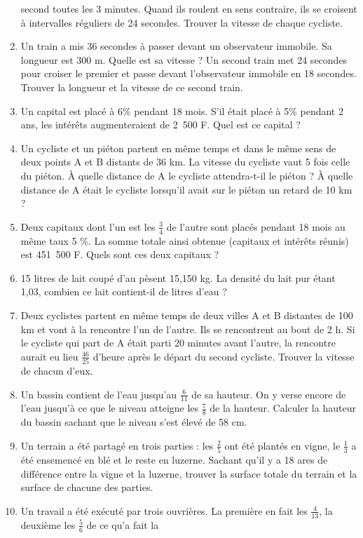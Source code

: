 \begin{enumerate}
 second toutes les 3 minutes. Quand ils roulent en sens contraire, ils se croisent à intervalles réguliers de 24 secondes. Trouver la 
 vitesse de chaque cycliste. 
 \item Un train a mis 36 secondes à passer devant un observateur immobile. Sa longueur est 300 m. Quelle est sa vitesse ? Un second 
 train met 24 secondes pour croiser le premier et passe devant l'observateur immobile en 18 secondes. Trouver la longueur et la 
 vitesse de ce second train. 
 \item Un capital est placé à 6\% pendant 18 mois. S'il était placé à 5\% pendant 2 ans, les intérêts augmenteraient de 2~500 F. Quel 
 est ce capital ?
 \item Un cycliste et un piéton partent en même temps et dans le même sens de deux points A et B distants de 36 km. La vitesse du cycliste vaut 5 fois celle du piéton. À quelle distance de A le cycliste attendra-t-il le piéton ? À quelle distance de A était le cycliste lorsqu'il avait sur le piéton un retard de 10 km ?  
 \item Deux capitaux dont l'un est les $\frac34$ de l'autre sont placés pendant 18 mois au même taux 5 \%. La somme totale ainsi obtenue (capitaux et intérêts réunis) est 451~500 F. Quels sont ces deux capitaux ? 
 \item 15 litres de lait coupé d'au pèsent 15,150 kg. La densité du lait pur étant 1,03, combien ce lait contient-il de litres d'eau ? 
 \item Deux cyclistes partent en même temps de deux villes A et B distantes de 100 km et vont à la rencontre l'un de l'autre. Ils 
 se rencontrent au bout de 2 h. Si le cycliste qui part de A était parti 20 minutes avant l'autre, la rencontre aurait eu lieu
 $\frac{46}{25}$ d'heure après le départ du second cycliste. Trouver la vitesse de chacun d'eux. 
 \item Un bassin contient de l'eau jusqu'au $\frac6{11}$ de sa hauteur. On y verse encore de l'eau jusqu'à ce que le niveau atteigne les $\frac78$ de la hauteur. Calculer la hauteur du bassin sachant que le niveau s'est élevé de 58 cm.
 \item Un terrain a été partagé en trois parties : les $\frac25$ ont été plantés en vigne, le $\frac13$ a été ensemencé en blé et le reste en luzerne. Sachant qu'il y a 18 ares de différence entre la vigne et la luzerne, trouver la surface totale du terrain et
 la surface de chacune des parties. 
 \item Un travail a été exécuté par trois ouvrières. La première en fait les $\frac4{13}$, la deuxième les $\frac56$ de ce qu'a fait la 

\end{enumerate}
